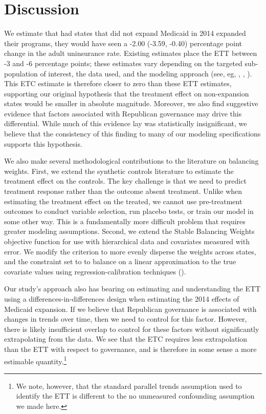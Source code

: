 \documentclass[12pt]{article}
\begin{document}
\section{Discussion}

We estimate that had states that did not expand Medicaid in 2014 expanded their programs, they would have seen a -2.00 (-3.59, -0.40) percentage point change in the adult uninsurance rate. Existing estimates place the ETT between -3 and -6 percentage points; these estimates vary depending on the targeted sub-population of interest, the data used, and the modeling approach (see, eg, \cite{courtemanche2017early}, \cite{kaestner2017effects}, \cite{frean2017premium}). This ETC estimate is therefore closer to zero than these ETT estimates, supporting our original hypothesis that the treatment effect on non-expansion states would be smaller in absolute magnitude. Moreover, we also find suggestive evidence that factors associated with Republican governance may drive this differential. While much of this evidence lay was statistically insignificant, we believe that the consistency of this finding to many of our modeling specifications supports this hypothesis.

We also make several methodological contributions to the literature on balancing weights. First, we extend the synthetic controls literature to estimate the treatment effect on the controls. The key challenge is that we need to predict treatment response rather than the outcome absent treatment. Unlike when estimating the treatment effect on the treated, we cannot use pre-treatment outcomes to conduct variable selection, run placebo tests, or train our model in some other way. This is a fundamentally more difficult problem that requires greater modeling assumptions. Second, we extend the Stable Balancing Weights objective function for use with hierarchical data and covariates measured with error. We modify the criterion to more evenly disperse the weights across states, and the constraint set to to balance on a linear approximation to the true covariate values using regression-calibration techniques (\cite{gleser1992importance}).

Our study's approach also has bearing on estimating and understanding the ETT using a differences-in-differences design when estimating the 2014 effects of Medicaid expansion. If we believe that Republican governance is associated with changes in trends over time, then we need to control for this factor. However, there is likely insufficient overlap to control for these factors without significantly extrapolating from the data. We see that the ETC requires less extrapolation than the ETT with respect to governance, and is therefore in some sense a more estimable quantity.\footnote{We note, however, that the standard parallel trends assumption used to identify the ETT is different to the no unmeasured confounding assumption we made here.} 
\end{document}
